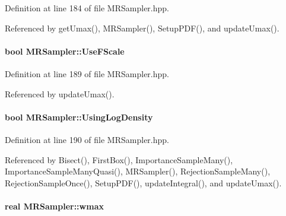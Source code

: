 \-Definition at line 184 of file \-M\-R\-Sampler.\-hpp.



\-Referenced by get\-Umax(), \-M\-R\-Sampler(), \-Setup\-P\-D\-F(), and update\-Umax().

\hypertarget{classMRSampler_a64134c93ecebc9f1a53b32c07bc18858}{
\paragraph[{\-Use\-F\-Scale}]{\setlength{\rightskip}{0pt plus 5cm}bool {\bf \-M\-R\-Sampler\-::\-Use\-F\-Scale}}}\label{classMRSampler_a64134c93ecebc9f1a53b32c07bc18858}


\-Definition at line 189 of file \-M\-R\-Sampler.\-hpp.



\-Referenced by update\-Umax().

\hypertarget{classMRSampler_a5f1bfb7fca5ef5a992a9bc812b19bddd}{
\paragraph[{\-Using\-Log\-Density}]{\setlength{\rightskip}{0pt plus 5cm}bool {\bf \-M\-R\-Sampler\-::\-Using\-Log\-Density}}}\label{classMRSampler_a5f1bfb7fca5ef5a992a9bc812b19bddd}


\-Definition at line 190 of file \-M\-R\-Sampler.\-hpp.



\-Referenced by \-Bisect(), \-First\-Box(), \-Importance\-Sample\-Many(), \-Importance\-Sample\-Many\-Quasi(), \-M\-R\-Sampler(), \-Rejection\-Sample\-Many(), \-Rejection\-Sample\-Once(), \-Setup\-P\-D\-F(), update\-Integral(), and update\-Umax().

\hypertarget{classMRSampler_af151b4e7e703ba21c87ae895c6b904f4}{
\paragraph[{wmax}]{\setlength{\rightskip}{0pt plus 5cm}real {\bf \-M\-R\-Sampler\-::wmax}}}\label{classMRSampler_af151b4e7e703ba21c87ae895c6b904f4}


